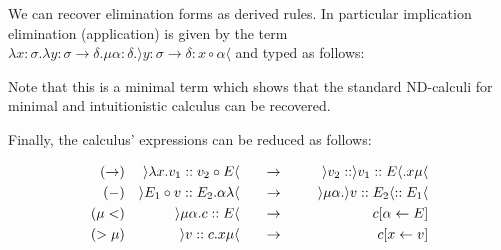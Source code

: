 \documentclass{IOS-Book-Article}
\begin{document}
\begin{example}
  We can recover elimination forms as derived rules. In particular implication elimination (application) is given by the term $\lambda x: \sigma. \lambda y : \sigma \rightarrow \delta. \mu\alpha:\delta.\rangle y : \sigma \rightarrow \delta : x \circ \alpha \langle$ and typed as follows:

  \begin{center}
    \begin{prooftree}
    \end{prooftree}
  \end{center}
  Note that this is a minimal term which shows that the standard ND-calculi for minimal and intuitionistic calculus can be recovered.
\end{example}

Finally, the calculus' expressions can be reduced as follows:

\begin{align*}
  (\rightarrow&) & \rangle \lambda x. v_1 :: v_2 \circ E \langle &\mathrel{\mkern30mu\rightarrow\mkern30mu}   &\rangle v_2 :  : \rangle v_1 :: E \langle . x \mu\langle \\
  (-&) & \rangle E_1 \circ v :: E_2.\alpha \lambda \langle &\mathrel{\mkern30mu\rightarrow\mkern30mu}  &\rangle \mu \alpha. \rangle v :: E_2 \langle :: E_1\langle \\
  (\mu<&) & \rangle \mu \alpha.c :: E \langle &\mathrel{\mkern30mu\rightarrow\mkern30mu} &c[\alpha \leftarrow E]\\
  (>\mu&) & \rangle v :: c.x\mu \langle &\mathrel{\mkern30mu\rightarrow\mkern30mu} &c[x \leftarrow v]                                                       
\end{align*}
\end{document}
